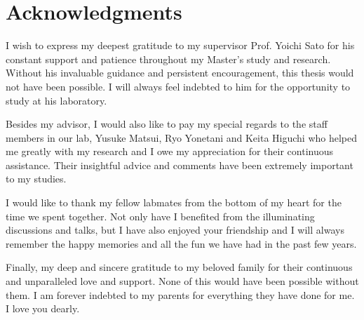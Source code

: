 
\chapter*{Acknowledgments}


I wish to express my deepest gratitude to my supervisor Prof. Yoichi Sato for his constant support and patience throughout my Master's study and research.
Without his invaluable guidance and persistent encouragement, this thesis would not have been possible. I will always feel indebted to him for the opportunity to study at his laboratory.

Besides my advisor, I would also like to pay my special regards to the staff members in our lab, Yusuke Matsui, Ryo Yonetani and Keita Higuchi who helped me greatly with my research and I owe my appreciation for their continuous assistance. Their insightful advice and comments have been extremely important to my studies.

I would like to thank my fellow labmates from the bottom of my heart for the time we spent together. Not only have I benefited from the illuminating discussions and talks, but I have also enjoyed your friendship and I will always remember the happy memories and all the fun we have had in the past few years.

Finally, my deep and sincere gratitude to my beloved family for their continuous and unparalleled love and support. None of this would have been possible without them. I am forever indebted to my parents for everything they have done for me. I love you dearly.


